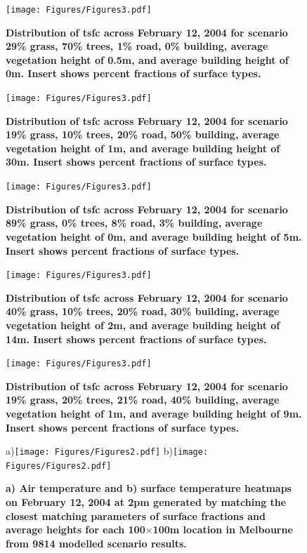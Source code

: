 \documentclass[final,3p,times,authoryear]{elsarticle}
\begin{document}
\begin{figure}
\centering
\texttt{[image: Figures/Figures3.pdf]}
\caption{\bf Distribution of \gls{tsfc} across February 12, 2004 for scenario 29\% grass, 70\% trees, 1\% road, 0\% building, average vegetation height of 0.5m, and average building height of 0m. Insert shows percent fractions of surface types.}
 \label{fig:dist3}
\end{figure}

\begin{figure}
\centering
\texttt{[image: Figures/Figures3.pdf]}
\caption{\bf Distribution of \gls{tsfc} across February 12, 2004 for scenario 19\% grass, 10\% trees, 20\% road, 50\% building, average vegetation height of 1m, and average building height of 30m. Insert shows percent fractions of surface types.}
 \label{fig:dist4}
\end{figure}


\begin{figure}
\centering
\texttt{[image: Figures/Figures3.pdf]}
\caption{\bf Distribution of \gls{tsfc} across February 12, 2004 for scenario 89\% grass, 0\% trees, 8\% road, 3\% building, average vegetation height of 0m, and average building height of 5m. Insert shows percent fractions of surface types.}
 \label{fig:dist5}
\end{figure}


\begin{figure}
\centering
\texttt{[image: Figures/Figures3.pdf]}
\caption{\bf Distribution of \gls{tsfc} across February 12, 2004 for scenario 40\% grass, 10\% trees, 20\% road, 30\% building, average vegetation height of 2m, and average building height of 14m. Insert shows percent fractions of surface types.}
 \label{fig:dist6}
\end{figure}

\begin{figure}
\centering
\texttt{[image: Figures/Figures3.pdf]}
\caption{\bf Distribution of \gls{tsfc} across February 12, 2004 for scenario 19\% grass, 20\% trees, 21\% road, 40\% building, average vegetation height of 1m, and average building height of 9m. Insert shows percent fractions of surface types.}
 \label{fig:dist7}
\end{figure}


\begin{figure}
\centering
a)\texttt{[image: Figures/Figures2.pdf]}
b)\texttt{[image: Figures/Figures2.pdf]}
\caption{\bf a) Air temperature and b) surface temperature heatmaps on February 12, 2004 at 2pm generated by matching the closest matching parameters of surface fractions and average heights for each 100$\times$100m location in Melbourne from 9814 modelled scenario results.  }
 \label{fig:TaMelb}
\end{figure}
\end{document}
